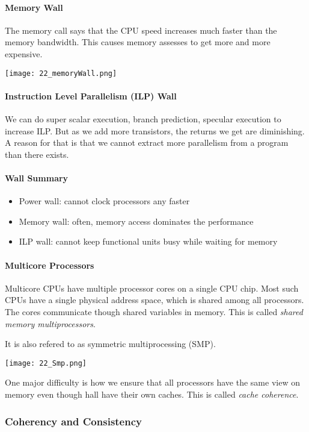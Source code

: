 \paragraph{Memory Wall}
The memory call says that the CPU speed increases much faster than the memory bandwidth. This causes memory assesses to get more and more expensive.

\texttt{[image: 22\_memoryWall.png]}

\paragraph{Instruction Level Parallelism (ILP) Wall}
We can do super scalar execution, branch prediction, specular execution to increase ILP. But as we add more transistors, the returns we get are diminishing. A reason for that is that we cannot extract more parallelism from a program than there exists.

\paragraph{Wall Summary}
\begin{itemize}
    \item Power wall: cannot clock processors any faster
    \item Memory wall: often, memory access dominates the performance
    \item ILP wall: cannot keep functional units busy while waiting for memory
\end{itemize}

\paragraph{Multicore Processors}
Multicore CPUs have multiple processor cores on a single CPU chip. Most such CPUs have a single physical address space, which is shared among all processors. The cores communicate though shared variables in memory. This is called \textit{shared memory multiprocessors}.

It is also refered to as symmetric multiprocessing (SMP).

\texttt{[image: 22\_Smp.png]}

One major difficulty is how we ensure that all processors have the same view on memory even though hall have their own caches. This is called \textit{cache coherence}.

\subsubsection{Coherency and Consistency}


